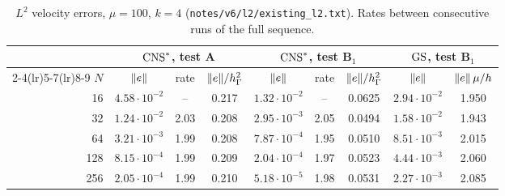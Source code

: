 \begin{table}[t]
\centering\small
\caption{$L^2$ velocity errors, $\mu=100$, $k=4$ (\texttt{notes/v6/l2/existing\_l2.txt}). Rates between consecutive runs of the full sequence.}\label{l2:tab}
\begin{tabular}{rcccccccc}
\toprule
 & \multicolumn{3}{c}{$\mathrm{CNS}^\ast$, test A} & \multicolumn{3}{c}{$\mathrm{CNS}^\ast$, test B$_1$} & \multicolumn{2}{c}{$\mathrm{GS}$, test B$_1$}\\
\cmidrule(lr){2-4}\cmidrule(lr){5-7}\cmidrule(lr){8-9}
$N$ & $\lVert e\rVert$ & rate & $\lVert e\rVert/h_\Gamma^2$ & $\lVert e\rVert$ & rate & $\lVert e\rVert/h_\Gamma^2$ & $\lVert e\rVert$ & $\lVert e\rVert\,\mu/h$\\
\midrule
16 & $4.58\cdot10^{-2}$ & -- & 0.217 & $1.32\cdot10^{-2}$ & -- & 0.0625 & $2.94\cdot10^{-2}$ & 1.950\\
32 & $1.24\cdot10^{-2}$ & 2.03 & 0.208 & $2.95\cdot10^{-3}$ & 2.05 & 0.0494 & $1.58\cdot10^{-2}$ & 1.943\\
64 & $3.21\cdot10^{-3}$ & 1.99 & 0.208 & $7.87\cdot10^{-4}$ & 1.95 & 0.0510 & $8.51\cdot10^{-3}$ & 2.015\\
128 & $8.15\cdot10^{-4}$ & 1.99 & 0.209 & $2.04\cdot10^{-4}$ & 1.97 & 0.0523 & $4.44\cdot10^{-3}$ & 2.060\\
256 & $2.05\cdot10^{-4}$ & 1.99 & 0.210 & $5.18\cdot10^{-5}$ & 1.98 & 0.0531 & $2.27\cdot10^{-3}$ & 2.085\\
\bottomrule
\end{tabular}
\end{table}
